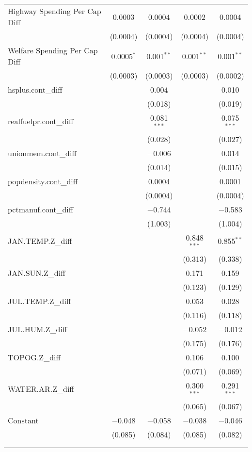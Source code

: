 \documentclass{article}
\begin{document}
\begin{table}[!htbp]
\begin{tabular}{@{\extracolsep{5pt}}lcccc}
  Highway Spending Per Cap Diff & 0.0003 & 0.0004 & 0.0002 & 0.0004 \\ 
  & (0.0004) & (0.0004) & (0.0004) & (0.0004) \\ 
  Welfare Spending Per Cap Diff & 0.0005$^{*}$ & 0.001$^{**}$ & 0.001$^{**}$ & 0.001$^{**}$ \\ 
  & (0.0003) & (0.0003) & (0.0003) & (0.0002) \\ 
  hsplus.cont\_diff &  & 0.004 &  & 0.010 \\ 
  &  & (0.018) &  & (0.019) \\ 
  realfuelpr.cont\_diff &  & 0.081$^{***}$ &  & 0.075$^{***}$ \\ 
  &  & (0.028) &  & (0.027) \\ 
  unionmem.cont\_diff &  & $-$0.006 &  & 0.014 \\ 
  &  & (0.014) &  & (0.015) \\ 
  popdensity.cont\_diff &  & 0.0004 &  & 0.0001 \\ 
  &  & (0.0004) &  & (0.0004) \\ 
  pctmanuf.cont\_diff &  & $-$0.744 &  & $-$0.583 \\ 
  &  & (1.003) &  & (1.004) \\ 
  JAN.TEMP.Z\_diff &  &  & 0.848$^{***}$ & 0.855$^{**}$ \\ 
  &  &  & (0.313) & (0.338) \\ 
  JAN.SUN.Z\_diff &  &  & 0.171 & 0.159 \\ 
  &  &  & (0.123) & (0.129) \\ 
  JUL.TEMP.Z\_diff &  &  & 0.053 & 0.028 \\ 
  &  &  & (0.116) & (0.118) \\ 
  JUL.HUM.Z\_diff &  &  & $-$0.052 & $-$0.012 \\ 
  &  &  & (0.175) & (0.176) \\ 
  TOPOG.Z\_diff &  &  & 0.106 & 0.100 \\ 
  &  &  & (0.071) & (0.069) \\ 
  WATER.AR.Z\_diff &  &  & 0.300$^{***}$ & 0.291$^{***}$ \\ 
  &  &  & (0.065) & (0.067) \\ 
  Constant & $-$0.048 & $-$0.058 & $-$0.038 & $-$0.046 \\ 
  & (0.085) & (0.084) & (0.085) & (0.082) \\ 
 \hline \\[-1.8ex] 
\hline 
\hline \\[-1.8ex] 
\end{tabular} 
\end{table} 
\end{document}
